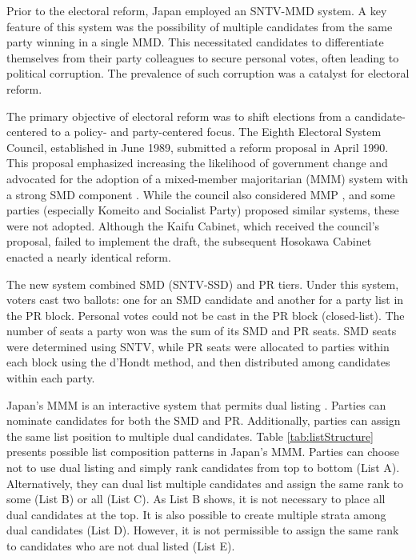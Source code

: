 \documentclass[a4paper, 11pt]{article}
\begin{document}
Prior to the electoral reform, Japan employed an SNTV-MMD system. A key feature of this system was the possibility of multiple candidates from the same party winning in a single MMD. This necessitated candidates to differentiate themselves from their party colleagues to secure personal votes, often leading to political corruption. The prevalence of such corruption was a catalyst for electoral reform.

The primary objective of electoral reform was to shift elections from a candidate-centered to a policy- and party-centered focus. The Eighth Electoral System Council, established in June 1989, submitted a reform proposal in April 1990. This proposal emphasized increasing the likelihood of government change and advocated for the adoption of a mixed-member majoritarian (MMM) system with a strong SMD component \citep{theasahishimbunShuuinNiShousenkyoku1990, yoshidaChusenkyokuseiKaraShosenkyokuhireidaihyou2018}. While the council also considered MMP \citep{theasahishimbunSenkyoseidoshinNoGijiroku1991}, and some parties (especially Komeito and Socialist Party) proposed similar systems, these were not adopted. Although the Kaifu Cabinet, which received the council's proposal, failed to implement the draft, the subsequent Hosokawa Cabinet enacted a nearly identical reform.

The new system combined SMD (SNTV-SSD) and PR tiers. Under this system, voters cast two ballots: one for an SMD candidate and another for a party list in the PR block. Personal votes could not be cast in the PR block (closed-list). The number of seats a party won was the sum of its SMD and PR seats. SMD seats were determined using SNTV, while PR seats were allocated to parties within each block using the d'Hondt method, and then distributed among candidates within each party.

Japan's MMM is an interactive system that permits dual listing \citep{pekkanenElectoralIncentivesMixedMember2006, reedJapaneseElectoralSystems2020}. Parties can nominate candidates for both the SMD and PR. Additionally, parties can assign the same list position to multiple dual candidates. Table \ref{tab:listStructure} presents possible list composition patterns in Japan's MMM. Parties can choose not to use dual listing and simply rank candidates from top to bottom (List A). Alternatively, they can dual list multiple candidates and assign the same rank to some (List B) or all (List C). As List B shows, it is not necessary to place all dual candidates at the top. It is also possible to create multiple strata among dual candidates (List D). However, it is not permissible to assign the same rank to candidates who are not dual listed (List E).
\end{document}
